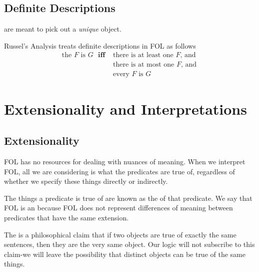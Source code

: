 \documentclass[12pt, a4paper, twoside, openright, titlepage]{book}
\begin{document}
\section{\textsection Definite Descriptions}

\begin{defn}{}{}
     are meant to pick out a \emph{unique} object.
\end{defn}


\begin{defn}{}{}
    Russel's Analysis treats definite descriptions in FOL as follows \begin{align*}
            \text{the $F$ is $G$ } \textbf{iff }& \text{there is at least one $F$, and }\\
            &\text{there is at most one $F$, and} \\
            &\text{every $F$ is $G$}
    \end{align*}
\end{defn}


\chapter{\textsection\textsection Extensionality and Interpretations}


\section{\textsection Extensionality}

\begin{rmk}{}{}
    FOL has no resources for dealing with nuances of meaning. When we interpret FOL, all we are considering is what the predicates are true of, regardless of whether we specify these things directly or indirectly.
\end{rmk}


\begin{defn}{}{}
    The things a predicate is true of are known as the  of that predicate. We say that FOL is an  because FOL does not represent differences of meaning between predicates that have the same extension.
\end{defn}

\begin{rmk}{}{}
    The  is a philosophical claim that if two objects are true of exactly the same sentences, then they are the very same object. Our logic will not subscribe to this claim-we will leave the possibility that distinct objects can be true of the same things.
\end{rmk}
\end{document}
